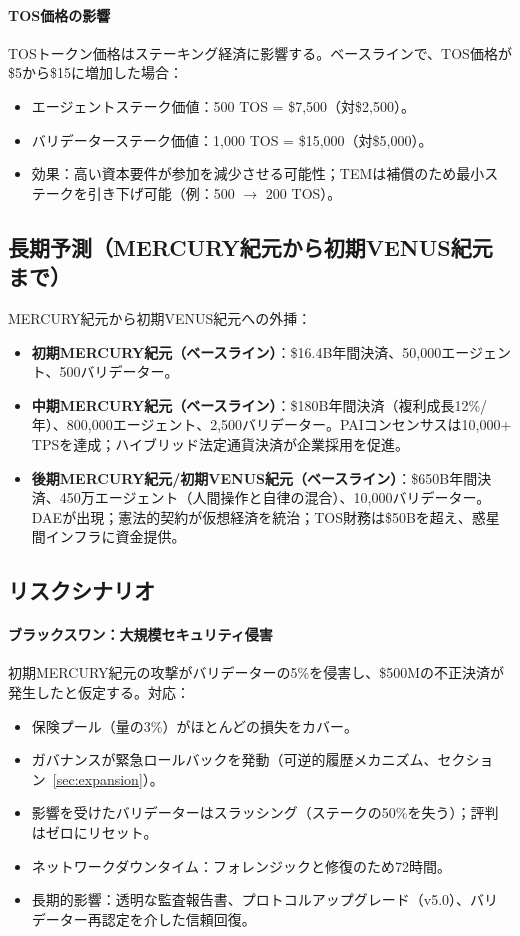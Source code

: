 \documentclass[11pt]{article}
\begin{document}
\paragraph{TOS価格の影響}
TOSトークン価格はステーキング経済に影響する。ベースラインで、TOS価格が\$5から\$15に増加した場合：
\begin{itemize}[noitemsep]
  \item エージェントステーク価値：500 TOS = \$7{,}500（対\$2{,}500）。
  \item バリデーターステーク価値：1,000 TOS = \$15{,}000（対\$5{,}000）。
  \item 効果：高い資本要件が参加を減少させる可能性；TEMは補償のため最小ステークを引き下げ可能（例：500 $\to$ 200 TOS）。
\end{itemize}

\subsection{長期予測（MERCURY紀元から初期VENUS紀元まで）}
MERCURY紀元から初期VENUS紀元への外挿：
\begin{itemize}[noitemsep]
  \item \textbf{初期MERCURY紀元（ベースライン）}：\$16.4B年間決済、50,000エージェント、500バリデーター。
  \item \textbf{中期MERCURY紀元（ベースライン）}：\$180B年間決済（複利成長12\%/年）、800,000エージェント、2,500バリデーター。PAIコンセンサスは10,000+ TPSを達成；ハイブリッド法定通貨決済が企業採用を促進。
  \item \textbf{後期MERCURY紀元/初期VENUS紀元（ベースライン）}：\$650B年間決済、450万エージェント（人間操作と自律の混合）、10,000バリデーター。DAEが出現；憲法的契約が仮想経済を統治；TOS財務は\$50Bを超え、惑星間インフラに資金提供。
\end{itemize}

\subsection{リスクシナリオ}
\paragraph{ブラックスワン：大規模セキュリティ侵害}
初期MERCURY紀元の攻撃がバリデーターの5\%を侵害し、\$500Mの不正決済が発生したと仮定する。対応：
\begin{itemize}[noitemsep]
  \item 保険プール（量の3\%）がほとんどの損失をカバー。
  \item ガバナンスが緊急ロールバックを発動（可逆的履歴メカニズム、セクション~\ref{sec:expansion}）。
  \item 影響を受けたバリデーターはスラッシング（ステークの50\%を失う）；評判はゼロにリセット。
  \item ネットワークダウンタイム：フォレンジックと修復のため72時間。
  \item 長期的影響：透明な監査報告書、プロトコルアップグレード（v5.0）、バリデーター再認定を介した信頼回復。
\end{itemize}
\end{document}

